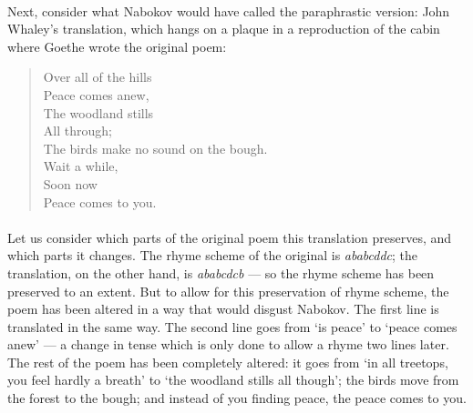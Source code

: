 \paragraph{}{Next, consider what Nabokov would have called the
  paraphrastic version: John Whaley's translation, which hangs on a
  plaque in a reproduction of the cabin where Goethe wrote the
  original poem: \\}

\begin{minipage}{0.8\linewidth}
  \begin{verse}
    Over all of the hills \\
    Peace comes anew, \\
    The woodland stills \\
    All through; \\ 
    The birds make no sound on the bough. \\
    Wait a while, \\
    Soon now \\
    Peace comes to you. \\
  \end{verse}
\end{minipage}

\paragraph{}{Let us consider which parts of the original poem this
  translation preserves, and which parts it changes. The rhyme scheme
  of the original is {\it ababcddc}; the translation, on the other
  hand, is {\it ababcdcb} --- so the rhyme scheme has been preserved
  to an extent. But to allow for this preservation of rhyme scheme,
  the poem has been altered in a way that would disgust Nabokov. The
  first line is translated in the same way. The second line goes from
  `is peace' to `peace comes anew' --- a change in tense which is only
  done to allow a rhyme two lines later. The rest of the poem has been
  completely altered: it goes from `in all treetops, you feel hardly a
  breath' to `the woodland stills all though'; the birds move from the
  forest to the bough; and instead of you finding peace, the peace
  comes to you.}
